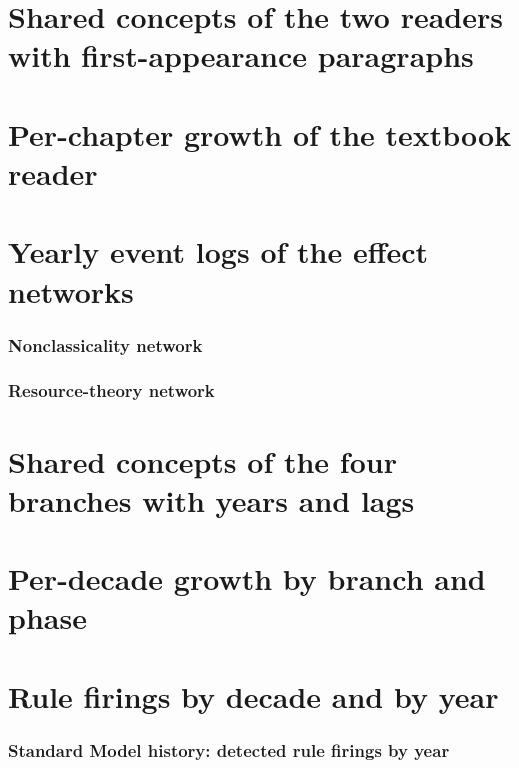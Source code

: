 \documentclass[11pt,a4paper,twoside,openany]{report}
\theoremstyle{plain}
\theoremstyle{definition}
\theoremstyle{remark}
\begin{document}
\chapter{Shared concepts of the two readers with first-appearance paragraphs}\label{app:order}
\small

\normalsize

\chapter{Per-chapter growth of the textbook reader}\label{app:chapters}
\small

\normalsize

\chapter{Yearly event logs of the effect networks}\label{app:events}
\small
\subsection*{Nonclassicality network}
\label{tab:evo_events_gpt}

\subsection*{Resource-theory network}
\label{tab:evo_events_qrt}

\normalsize

\chapter{Shared concepts of the four branches with years and lags}\label{app:lags}
\small
\label{tab:evo_concepts_lag}

\normalsize

\chapter{Per-decade growth by branch and phase}\label{app:decades}
\scriptsize

\normalsize

\chapter{Rule firings by decade and by year}\label{app:rulesyear}
\small
\label{tab:evo_rules_decade}

\subsection*{Standard Model history: detected rule firings by year}

\end{document}
